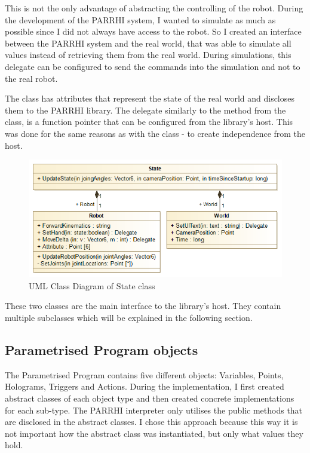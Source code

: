 This is not the only advantage of abstracting the controlling of the robot. During the development of the PARRHI system, I wanted to simulate as much as possible since I did not always have access to the robot. So I created an interface between the PARRHI system and the real world, that was able to simulate all values instead of retrieving them from the real world. During simulations, this delegate can be configured to send the commands into the simulation and not to the real robot.  

The  class has attributes that represent the state of the real world and discloses them to the PARRHI library. The  delegate similarly to the  method from the  class, is a function pointer that can be configured from the library's host. This was done for the same reasons as with the  class - to create independence from the host.

\begin{figure}[!h]
	\centering
	\includegraphics[width=0.7\linewidth]{Figures/Implementation_State}
	\caption[UML Class Diagram of State class]{UML Class Diagram of State class}
	\label{Fig:ImplementationState}
\end{figure}

These two classes are the main interface to the library's host. They contain multiple subclasses which will be explained in the following section.

\subsection{Parametrised Program objects}
The Parametrised Program contains five different objects: Variables, Points, Holograms, Triggers and Actions. During the implementation, I first created abstract classes of each object type and then created concrete implementations for each sub-type. The PARRHI interpreter only utilises the public methods that are disclosed in the abstract classes. I chose this approach because this way it is not important how the abstract class was instantiated, but only what values they hold.

